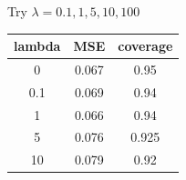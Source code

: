 \documentclass[]{article}
\begin{document}
Try \(\lambda = 0.1, 1, 5, 10, 100\)

\begin{longtable}[]{@{}ccc@{}}
\toprule
\begin{minipage}[b]{0.11\columnwidth}\centering\strut
lambda\strut
\end{minipage} & \begin{minipage}[b]{0.10\columnwidth}\centering\strut
MSE\strut
\end{minipage} & \begin{minipage}[b]{0.13\columnwidth}\centering\strut
coverage\strut
\end{minipage}\tabularnewline
\midrule
\endhead
\begin{minipage}[t]{0.11\columnwidth}\centering\strut
0\strut
\end{minipage} & \begin{minipage}[t]{0.10\columnwidth}\centering\strut
0.067\strut
\end{minipage} & \begin{minipage}[t]{0.13\columnwidth}\centering\strut
0.95\strut
\end{minipage}\tabularnewline
\begin{minipage}[t]{0.11\columnwidth}\centering\strut
0.1\strut
\end{minipage} & \begin{minipage}[t]{0.10\columnwidth}\centering\strut
0.069\strut
\end{minipage} & \begin{minipage}[t]{0.13\columnwidth}\centering\strut
0.94\strut
\end{minipage}\tabularnewline
\begin{minipage}[t]{0.11\columnwidth}\centering\strut
1\strut
\end{minipage} & \begin{minipage}[t]{0.10\columnwidth}\centering\strut
0.066\strut
\end{minipage} & \begin{minipage}[t]{0.13\columnwidth}\centering\strut
0.94\strut
\end{minipage}\tabularnewline
\begin{minipage}[t]{0.11\columnwidth}\centering\strut
5\strut
\end{minipage} & \begin{minipage}[t]{0.10\columnwidth}\centering\strut
0.076\strut
\end{minipage} & \begin{minipage}[t]{0.13\columnwidth}\centering\strut
0.925\strut
\end{minipage}\tabularnewline
\begin{minipage}[t]{0.11\columnwidth}\centering\strut
10\strut
\end{minipage} & \begin{minipage}[t]{0.10\columnwidth}\centering\strut
0.079\strut
\end{minipage} & \begin{minipage}[t]{0.13\columnwidth}\centering\strut
0.92\strut
\end{minipage}\tabularnewline
\bottomrule
\end{longtable}
\end{document}
